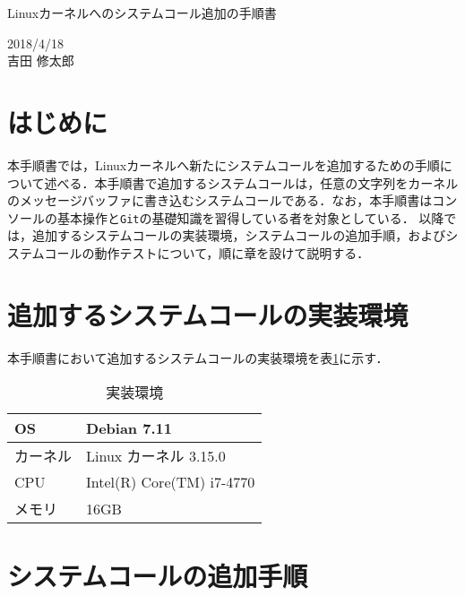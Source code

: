 \documentclass[12pt]{jsarticle}
\begin{document}
\begin{center}
  {\LARGE Linuxカーネルへのシステムコール追加の手順書}
\end{center}

\begin{flushright}
  2018/4/18\\
  吉田 修太郎
\end{flushright}
\section{はじめに}
本手順書では，Linuxカーネルへ新たにシステムコールを追加するための手順について述べる．本手順書で追加するシステムコールは，任意の文字列をカーネルのメッセージバッファに書き込むシステムコールである．なお，本手順書はコンソールの基本操作と\verb|Git|の基礎知識を習得している者を対象としている．
以降では，追加するシステムコールの実装環境，システムコールの追加手順，およびシステムコールの動作テストについて，順に章を設けて説明する．

\section{追加するシステムコールの実装環境}\label{sec2}
本手順書において追加するシステムコールの実装環境を表\ref{table1}に示す．
\begin{table}[h!]
  \begin{center}
    \caption{実装環境}%
    \begin{tabular}{l|l}
      \hline\hline
      OS & Debian 7.11 \\
      \hline
      カーネル & Linux カーネル 3.15.0 \\
      \hline
      CPU & Intel(R) Core(TM) i7-4770 \\
      \hline
      メモリ & 16GB\\
      \hline
    \end{tabular}
    \label{table1}
  \end{center}
\end{table}

\section{システムコールの追加手順}
\end{document}
